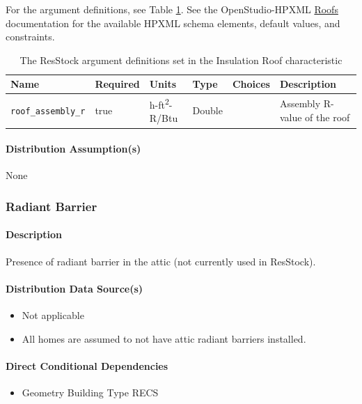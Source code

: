 For the argument definitions, see Table \ref{table:hc_arg_def_ins_roof}. See the OpenStudio-HPXML \href{https://openstudio-hpxml.readthedocs.io/en/v1.8.1/workflow_inputs.html#hpxml-roofs}{Roofs} documentation for the available HPXML schema elements, default values, and constraints.

\begin{longtable}[]{|p{3.5cm}|p{1.5cm}|p{1.3cm}|p{1.1cm}|p{}|p{3.3cm}|} \caption{The ResStock argument definitions set in the Insulation Roof characteristic} \label{table:hc_arg_def_ins_roof} \\
\toprule\noalign{}
Name & Required & Units & Type & Choices & Description \\
\midrule\noalign{}
\endhead
\bottomrule\noalign{}
\endlastfoot
\texttt{roof\_assembly\_r} & true & h-ft\textsuperscript{2}-R/Btu & Double & &
Assembly R-value of the roof \\
\end{longtable}

\paragraph{Distribution Assumption(s)}
None
\subsubsection{Radiant Barrier}\label{radiant_barrier}
\paragraph{Description}

Presence of radiant barrier in the attic (not currently used in
ResStock).
\paragraph{Distribution Data Source(s)}
\begin{itemize}
 
\item
  Not applicable
\item
  All homes are assumed to not have attic radiant barriers installed.
\end{itemize}
\paragraph{Direct Conditional Dependencies}
 
\begin{itemize}
    \item Geometry Building Type RECS
\end{itemize}
